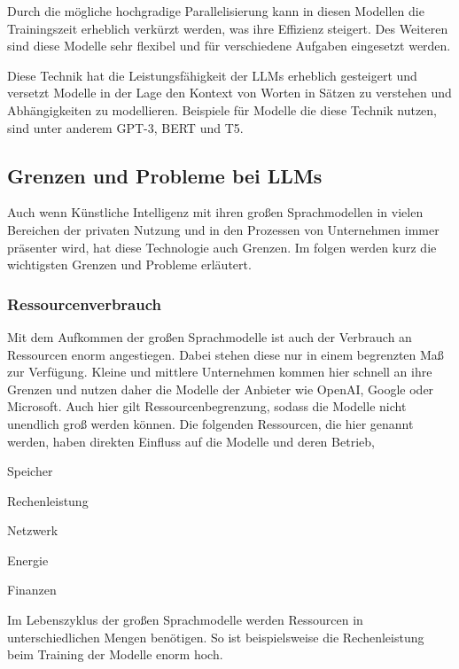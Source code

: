 Durch die mögliche hochgradige Parallelisierung kann in diesen Modellen die Trainingszeit erheblich verkürzt werden, was ihre Effizienz steigert. Des Weiteren sind diese Modelle sehr flexibel und für verschiedene Aufgaben eingesetzt werden.\vspace{0.2cm}

Diese Technik hat die Leistungsfähigkeit der LLMs erheblich gesteigert und versetzt Modelle in der Lage den Kontext von Worten in Sätzen zu verstehen und Abhängigkeiten zu modellieren. Beispiele für Modelle die diese Technik nutzen, sind unter anderem GPT-3, BERT und T5.


\subsection{Grenzen und Probleme bei LLMs}
Auch wenn Künstliche Intelligenz mit ihren großen Sprachmodellen in vielen Bereichen der privaten Nutzung und in den Prozessen von Unternehmen immer präsenter wird, hat diese Technologie auch Grenzen. Im folgen werden kurz die wichtigsten Grenzen und Probleme erläutert.

\subsubsection{Ressourcenverbrauch}
Mit  dem Aufkommen der großen Sprachmodelle ist auch der Verbrauch an Ressourcen enorm angestiegen. Dabei stehen diese nur in einem begrenzten Maß zur Verfügung. Kleine und mittlere Unternehmen kommen hier schnell an ihre Grenzen und nutzen daher die Modelle der Anbieter wie OpenAI, Google oder Microsoft. Auch hier gilt Ressourcenbegrenzung, sodass die Modelle nicht unendlich groß werden können. Die folgenden Ressourcen, die hier genannt werden, haben direkten Einfluss auf die Modelle und deren Betrieb,

\begin{myitemize}
	\item Speicher
	\item Rechenleistung
	\item Netzwerk
	\item Energie
	\item Finanzen
\end{myitemize}

Im Lebenszyklus der großen Sprachmodelle werden Ressourcen in unterschiedlichen Mengen benötigen. So ist beispielsweise die Rechenleistung beim Training der Modelle enorm hoch.

